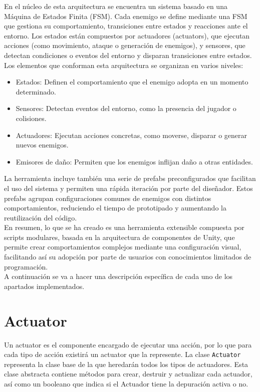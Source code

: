 En el núcleo de esta arquitectura se encuentra un sistema basado en una Máquina de Estados Finita (FSM). Cada enemigo se define mediante una FSM que gestiona su comportamiento, transiciones entre estados y reacciones ante el entorno. Los estados están compuestos por actuadores (actuators), que ejecutan acciones (como movimiento, ataque o generación de enemigos), y sensores, que detectan condiciones o eventos del entorno y disparan transiciones entre estados.\\

Los elementos que conforman esta arquitectura se organizan en varios niveles:
\begin{itemize}
	\item Estados: Definen el comportamiento que el enemigo adopta en un momento determinado.
	\item Sensores: Detectan eventos del entorno, como la presencia del jugador o colisiones.
	\item Actuadores: Ejecutan acciones concretas, como moverse, disparar o generar nuevos enemigos.
	\item Emisores de daño: Permiten que los enemigos inflijan daño a otras entidades.
\end{itemize}

La herramienta incluye también una serie de prefabs preconfigurados que facilitan el uso del sistema y permiten una rápida iteración por parte del diseñador. Estos prefabs agrupan configuraciones comunes de enemigos con distintos comportamientos, reduciendo el tiempo de prototipado y aumentando la reutilización del código.\\

En resumen, lo que se ha creado es una herramienta extensible compuesta por scripts modulares, basada en la arquitectura de componentes de Unity, que permite crear comportamientos complejos mediante una configuración visual, facilitando así su adopción por parte de usuarios con conocimientos limitados de programación.\\

A continuación se va a hacer una descripción específica de cada uno de los apartados implementados.


\section{Actuator}

Un actuator es el componente encargado de ejecutar una acción, por lo que para cada tipo de acción existirá un actuator que la represente.
La clase \texttt{Actuator} representa la clase base de la que heredarán todos los tipos de actuadores.
Esta clase abstracta contiene métodos para crear, destruir y actualizar cada actuador, así como un booleano que indica si el Actuador tiene la depuración activa o no.\\

